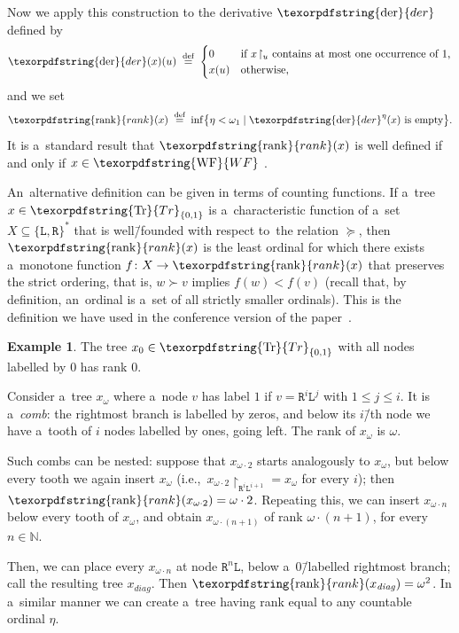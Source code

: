 \documentclass[11pt,a4paper]{amsart}
\theoremstyle{plain}
\theoremstyle{definition}
\newtheorem{exa}[thm]{Example}
\theoremstyle{defC}
\theoremstyle{thmC}
\theoremstyle{plain}
\numberwithin{equation}{section}
\numberwithin{equation}{section}
\numberwithin{figure}{section}
\newcommand{\ident}[1]{\ensuremath{\texorpdfstring{\mathrm{\mathnm{#1}}}{#1}}\xspace}
\newcommand{\domain}[1]{\ensuremath{\mathbb{#1}}\xspace}
\newcommand{\N}{\domain{N}}
\newcommand{\eqdef}{\stackrel{\text{def}}=}
\newcommand{\dL}{\mathtt{{\scriptstyle L}}}
\newcommand{\dR}{\mathtt{{\scriptstyle R}}}
\newcommand{\mathnm}[1]{#1}
\newcommand{\restr}{{\upharpoonright}}
\newcommand{\trees}{\ident{Tr}}
\newcommand{\WF}{\ident{WF}}
\newcommand{\der}{\ident{der}}
\newcommand{\rank}{\ident{rank}}
\begin{document}
Now we apply this construction to the derivative $\der$ defined by
\[
\der(x)(u) \;\eqdef\;
\begin{cases}
  0	& \text{if $x\!\restriction_u$ contains at most one occurrence of $1$,} \\
  x(u)	& \text{otherwise,}
\end{cases}
\]
and we set
\[
\rank(x) \;\eqdef\; \inf\bigl\{\eta < \omega_1 \mid \der^\eta(x) \text{ is empty}\bigr\}.
\]
\noindent %
It is a~standard result that $\rank(x)$ is well defined if and only if $x \in \WF$ \cite{kechris_descriptive}.

An~alternative definition can be given in terms of counting functions.
If a~tree $x\in\trees_{\{0,1\}}$ is a~characteristic function of a~set $X \subseteq \{\dL,\dR\}^\ast$ that is well\=/founded with respect to~the relation $\succeq$,
then $\rank(x)$ is the least ordinal for which there exists a~monotone function $f\colon X \to \rank(x)$ that preserves the strict ordering, that is, $w \succ v$ implies $f(w) < f(v)$
(recall that, by definition, an~ordinal is a~set of all strictly smaller ordinals).
This is the definition we have used in the conference version of the paper~\cite{dichotomy-stacs}.

\begin{exa} \label{przyklad-grzebien}
	The tree $x_0\in\trees_{\{0,1\}}$ with all nodes labelled by $0$ has rank $0$.

	Consider a~tree $x_\omega$ where a~node $v$ has label $1$ if $v=\dR^i\dL^j$ with $1\leq j\leq i$.
	It is a~\emph{comb}: the rightmost branch is labelled by zeros, and below its $i$\=/th node we have a~tooth of $i$ nodes labelled by ones, going left.
	The rank of $x_\omega$ is $\omega$.

	Such combs can be nested: suppose that $x_{\omega\cdot 2}$ starts analogously to $x_\omega$, but below every tooth we again insert $x_\omega$ (i.e.,~$x_{\omega\cdot 2}\restr_{\dR^i\dL^{i+1}}=x_\omega$ for every $i$);
	then $\rank(x_{\omega\cdot 2})=\omega\cdot 2$.
	Repeating this, we can insert $x_{\omega\cdot n}$ below every tooth of $x_\omega$, and obtain $x_{\omega\cdot(n{+}1)}$ of rank $\omega\cdot(n{+}1)$, for every $n\in\N$.
	
	Then, we can place every $x_{\omega\cdot n}$ at node $\dR^n\dL$, below a~$0$\=/labelled rightmost branch; call the resulting tree $x_{\mathit{diag}}$.
	Then $\rank(x_{\mathit{diag}}) = \omega^2$.
	In a~similar manner we can create a~tree having rank equal to any countable ordinal $\eta$.
\end{exa}
\end{document}
